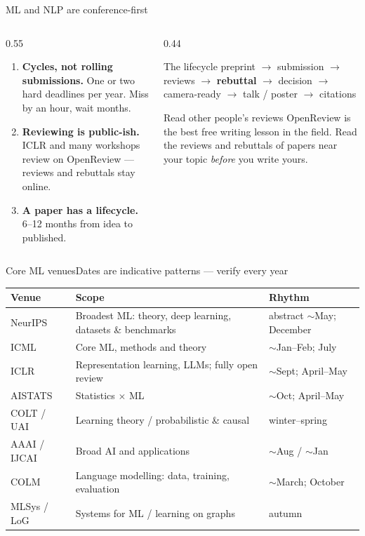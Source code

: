 \documentclass[aspectratio=169,11pt]{beamer}
\newcommand{\key}[1]{\textbf{\color{brand}#1}}
\begin{document}
\begin{frame}{ML and NLP are conference-first}
\begin{columns}[T]
\begin{column}{0.55\textwidth}
\begin{enumerate}
  \item \key{Cycles, not rolling submissions.} One or two hard deadlines per
        year. Miss by an hour, wait months.
  \item \key{Reviewing is public-ish.} ICLR and many workshops review on
        OpenReview --- reviews and rebuttals stay online.
  \item \key{A paper has a lifecycle.} 6--12 months from idea to published.
\end{enumerate}
\end{column}
\begin{column}{0.44\textwidth}
\begin{block}{The lifecycle}
\footnotesize
preprint $\rightarrow$ submission $\rightarrow$ reviews $\rightarrow$
\textbf{rebuttal} $\rightarrow$ decision $\rightarrow$ camera-ready
$\rightarrow$ talk / poster $\rightarrow$ citations
\end{block}
\begin{alertblock}{Read other people's reviews}
\footnotesize
OpenReview is the best free writing lesson in the field. Read the reviews and
rebuttals of papers near your topic \emph{before} you write yours.
\end{alertblock}
\end{column}
\end{columns}
\end{frame}

\begin{frame}{Core ML venues}{Dates are indicative patterns --- verify every year}
\footnotesize
\begin{tabularx}{\textwidth}{>{\raggedright\arraybackslash}p{2.1cm} X >{\raggedright\arraybackslash}p{3.5cm}}
\toprule
\textbf{\color{brand}Venue} & \textbf{\color{brand}Scope} & \textbf{\color{brand}Rhythm} \\
\midrule
\rowcolor{rowtint}
NeurIPS & Broadest ML: theory, deep learning, datasets \& benchmarks & abstract $\sim$May; December \\
ICML & Core ML, methods and theory & $\sim$Jan--Feb; July \\
\rowcolor{rowtint}
ICLR & Representation learning, LLMs; fully open review & $\sim$Sept; April--May \\
AISTATS & Statistics $\times$ ML & $\sim$Oct; April--May \\
\rowcolor{rowtint}
COLT / UAI & Learning theory / probabilistic \& causal & winter--spring \\
AAAI / IJCAI & Broad AI and applications & $\sim$Aug / $\sim$Jan \\
\rowcolor{rowtint}
COLM & Language modelling: data, training, evaluation & $\sim$March; October \\
MLSys / LoG & Systems for ML / learning on graphs & autumn \\
\bottomrule
\end{tabularx}
\end{frame}
\end{document}
